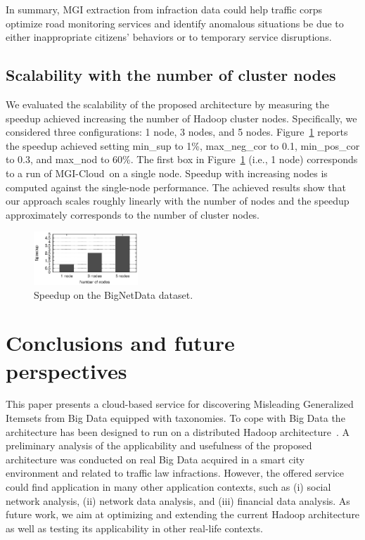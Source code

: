 \documentclass[10pt, conference, compsocconf]{IEEEtran}
\newcommand{\SeTAB}{{\sc MGI-Cloud}}
\begin{document}
In summary, MGI extraction from infraction data could help traffic corps optimize road monitoring services and identify anomalous situations be due to either inappropriate citizens' behaviors or to temporary service disruptions.

\subsection{Scalability with the number of cluster nodes}
\label{scalability}

We evaluated the scalability of the proposed architecture by measuring the speedup achieved increasing the number of Hadoop cluster nodes.
Specifically, we considered three configurations: 1 node, 3 nodes, and 5 nodes.
Figure~\ref{fig:speedup} reports the speedup achieved setting min\_sup to 1\%, max\_neg\_cor to 0.1, min\_pos\_cor to 0.3, and 
max\_nod to 60\%. 
The first box in Figure~\ref{fig:speedup} (i.e., 1 node) corresponds
to a run of \SeTAB\ on a single node. Speedup with increasing nodes is computed against the single-node performance. 
The achieved results show that our approach scales roughly linearly with the number of nodes and the speedup 
approximately corresponds to the number of cluster nodes. 

\begin{figure}[t]
\centering
\includegraphics[width=0.35\textwidth]{grafici/graficoSpeedup.eps}
\caption{Speedup on the BigNetData dataset.}
\label{fig:speedup}
\end{figure}


\section{Conclusions and future perspectives}
\label{conclusion}
This paper presents a cloud-based service for discovering Misleading Generalized Itemsets from Big Data equipped with taxonomies.
To cope with Big Data the architecture has been designed to run on a distributed Hadoop architecture~\cite{Dean2008}.
A preliminary analysis of the applicability and usefulness of the proposed architecture was conducted on real Big Data 
acquired in a smart city environment and related to traffic law infractions.
However, the offered service could find application in many other application contexts, such as (i) social network analysis, 
(ii) network data analysis, and (iii) financial data analysis. 
As future work, we aim at optimizing and extending the current Hadoop architecture as well as testing its applicability in other real-life contexts. 





\end{document}
